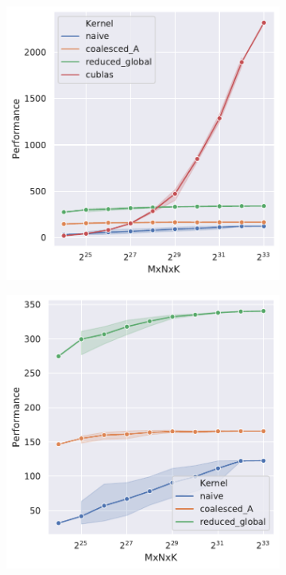 \documentclass[titlepage]{article}
\begin{document}
\begin{figure}[h!]
    \begin{subfigure}{0.49\textwidth}
        \includegraphics[width=\textwidth]{z2_cublas.pdf}
        \caption{}
    \end{subfigure}
    \begin{subfigure}{0.49\textwidth}
        \includegraphics[width=\textwidth]{z2.pdf}
        \caption{}
    \end{subfigure}
    \caption{}
\end{figure}
\end{document}

